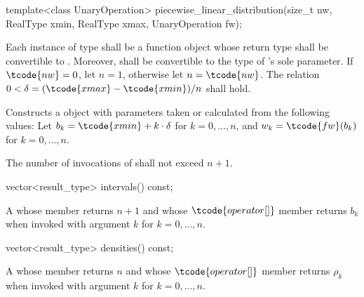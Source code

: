 %
\begin{itemdecl}
template<class UnaryOperation>
 piecewise_linear_distribution(size_t nw, RealType xmin, RealType xmax, UnaryOperation fw);
\end{itemdecl}

\begin{itemdescr}
\pnum\requires
 Each instance of type 
 shall be a function object
 whose return type shall be convertible to .
 Moreover,
  shall be convertible
 to the type of 's sole parameter.
 If $\tcode{nw} = 0$, let $n = 1$, otherwise let $n = \tcode{nw}$.
 The relation $0 < \delta = (\tcode{xmax} - \tcode{xmin}) / n$
 shall hold.

\pnum\effects Constructs a  object
 with parameters taken or calculated
 from the following values:
 Let $b_k = \tcode{xmin} + k \cdot \delta$ for $k = 0, \dotsc, n$,
 and $w_k = \tcode{fw}(b_k)$ for $k = 0, \dotsc, n$.

\pnum\complexity
 The number of invocations of  shall not exceed $n+1$.
\end{itemdescr}

%
\begin{itemdecl}
vector<result_type> intervals() const;
\end{itemdecl}

\begin{itemdescr}
\pnum\returns A 
 whose  member returns $n + 1$
 and whose $ \tcode{operator[]} $ member returns $b_k$
 when invoked with argument $k$ for $k = 0, \dotsc, n$.
\end{itemdescr}

%
\begin{itemdecl}
vector<result_type> densities() const;
\end{itemdecl}

\begin{itemdescr}
\pnum\returns A 
 whose  member returns $n$
 and whose $ \tcode{operator[]} $ member returns $\rho_k$
 when invoked with argument $k$ for $k = 0, \dotsc, n$.
\end{itemdescr}%
%
%
%
%

